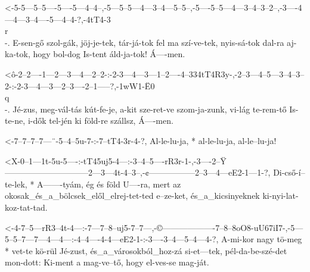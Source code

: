 

  {<-5-5---5--5----5----5---4--4--,-5---5--5---4---3--4---5--5--,-5----5--5---4---3--4--3--2--,-3----4---4---3--4----5---4--4-?,-4tT4-3\\r\\-.}
  {  E-sen-gő szol-gák, jöj-je-tek, tár-já-tok fel ma szí-ve-tek, nyis-sá-tok dal-ra aj-ka-tok, hogy bol-dog Is-tent áld-ja-tok! Á----men.}



  {<ô-2--2----1---2---3---4---2--2-:-2-3---4---3---1--2----4--334tT4R3y-,-2--3---4--5---3--4--3--2-:-2-3---4---3---2--3----2--1-----?,-1wW1-Ë0\\q\\-.}
  {   Jé-zus, meg-vál-tás kút-fe-je, a-kit sze-ret-ve szom-ja-zunk,       vi-lág te-rem-tő Is-te-ne, i-dők tel-jén ki föld-re szállsz, Á----men.}

  {<-7--7--7--7---¨-5--4--5u-7-:-7--tT4-3r-4-?,}
  {  Al-le-lu-ja, * al-le-lu-ja, al-le--lu-ja!}





  {<X-0--1---1t-5u-5----:-tT45uj5-4---:-3--4--5----rR3r-1-,-3----2--Ÿ------------------------------2---3---4t-4--3--,-¢-----------------2--3---4---eE2-1---1-?,}
  {   Di-cső-í--te-lek, * A-------tyám, ég és föld U----ra, mert az okosak_és_a_bölcsek_elől_elrej-tet-ted e--ze-ket, és_a_kicsinyeknek ki-nyi-lat-koz-tat-tad.}


  {<-4-7--5---rR3--4t-4---:-7---7--8--uj5-7--7---,-©-------------------7--8--8oO8-uU67iI7-,-5---5--5--7---7---4---4---:-4--4----4-4---eE2-1-:-3----3--4---5--4---4-?,}
  {  A-mi-kor nagy tö-meg * vet-te kö-rül Jé-zust, és_a_városokból_hoz-zá si-et---tek,      pél-da-be-szé-det mon-dott: Ki-ment a mag-ve--tő, hogy el-ves-se mag-ját.}

